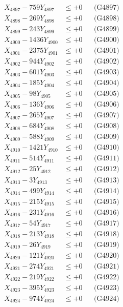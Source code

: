 \documentclass[a4paper,10pt]{article}
\begin{document}
{\begin{align}
X_{4897} - 759Y_{4897} &\leq +0 && \text{(G4897)} \\
X_{4898} - 269Y_{4898} &\leq +0 && \text{(G4898)} \\
X_{4899} - 243Y_{4899} &\leq +0 && \text{(G4899)} \\
X_{4900} - 1436Y_{4900} &\leq +0 && \text{(G4900)} \\
\allowbreak
X_{4901} - 2375Y_{4901} &\leq +0 && \text{(G4901)} \\
X_{4902} - 944Y_{4902} &\leq +0 && \text{(G4902)} \\
X_{4903} - 601Y_{4903} &\leq +0 && \text{(G4903)} \\
X_{4904} - 185Y_{4904} &\leq +0 && \text{(G4904)} \\
X_{4905} - 98Y_{4905} &\leq +0 && \text{(G4905)} \\
X_{4906} - 136Y_{4906} &\leq +0 && \text{(G4906)} \\
X_{4907} - 265Y_{4907} &\leq +0 && \text{(G4907)} \\
X_{4908} - 684Y_{4908} &\leq +0 && \text{(G4908)} \\
X_{4909} - 588Y_{4909} &\leq +0 && \text{(G4909)} \\
X_{4910} - 1421Y_{4910} &\leq +0 && \text{(G4910)} \\
\allowbreak
X_{4911} - 514Y_{4911} &\leq +0 && \text{(G4911)} \\
X_{4912} - 25Y_{4912} &\leq +0 && \text{(G4912)} \\
X_{4913} - 3Y_{4913} &\leq +0 && \text{(G4913)} \\
X_{4914} - 499Y_{4914} &\leq +0 && \text{(G4914)} \\
X_{4915} - 215Y_{4915} &\leq +0 && \text{(G4915)} \\
X_{4916} - 231Y_{4916} &\leq +0 && \text{(G4916)} \\
X_{4917} - 54Y_{4917} &\leq +0 && \text{(G4917)} \\
X_{4918} - 213Y_{4918} &\leq +0 && \text{(G4918)} \\
X_{4919} - 26Y_{4919} &\leq +0 && \text{(G4919)} \\
X_{4920} - 121Y_{4920} &\leq +0 && \text{(G4920)} \\
\allowbreak
X_{4921} - 274Y_{4921} &\leq +0 && \text{(G4921)} \\
X_{4922} - 219Y_{4922} &\leq +0 && \text{(G4922)} \\
X_{4923} - 395Y_{4923} &\leq +0 && \text{(G4923)} \\
X_{4924} - 974Y_{4924} &\leq +0 && \text{(G4924)} \\

\end{align}}
\end{document}
